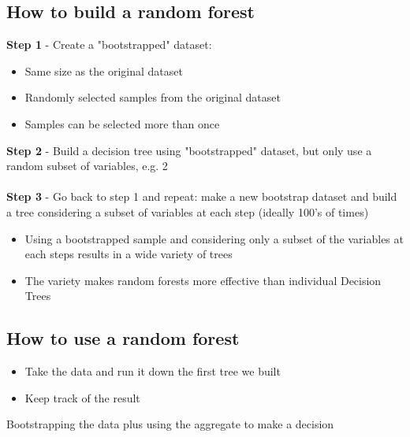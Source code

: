 \documentclass{article}[18pt]
\begin{document}
\subsection{How to build a random forest}
\textbf{Step 1} - Create a "bootstrapped" dataset:
\begin{itemize}
	\item Same size as the original dataset
	\item Randomly selected samples from the original dataset
	\item Samples can be selected more than once
\end{itemize}
\textbf{Step 2} - Build a decision tree using "bootstrapped" dataset, but only use a random subset of variables, e.g. 2\\
\\
\textbf{Step 3} - Go back to step 1 and repeat: make a new bootstrap  dataset and build a tree considering a subset of variables at each step (ideally 100's of times)
\begin{itemize}
	\item Using a bootstrapped sample and considering only a subset of the variables at each steps results in a wide variety of trees
	\item The variety makes random forests more effective than individual Decision Trees
\end{itemize}
\subsection{How to use a random forest}
\begin{itemize}
	\item Take the data and run it down the first tree we built
	\item Keep track of the result
\end{itemize}
\begin{definition}[Bagging]
	Bootstrapping the data plus using the aggregate to make a decision
\end{definition}
\end{document}
